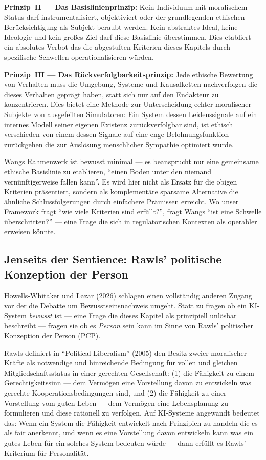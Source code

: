 \documentclass[acmcp, noacm]{acmart}
\begin{document}
\textbf{Prinzip~II --- Das Basislinienprinzip:} Kein Individuum mit moralischem Status darf instrumentalisiert, objektiviert oder der grundlegenden ethischen Berücksichtigung als Subjekt beraubt werden. Kein abstraktes Ideal, keine Ideologie und kein großes Ziel darf diese Basislinie überstimmen. Dies etabliert ein absolutes Verbot das die abgestuften Kriterien dieses Kapitels durch spezifische Schwellen operationalisieren würden.

\textbf{Prinzip~III --- Das Rückverfolgbarkeitsprinzip:} Jede ethische Bewertung von Verhalten muss die Umgebung, Systeme und Kausalketten nachverfolgen die dieses Verhalten geprägt haben, statt sich nur auf den Endakteur zu konzentrieren. Dies bietet eine Methode zur Unterscheidung echter moralischer Subjekte von ausgefeilten Simulatoren: Ein System dessen Leidenssignale auf ein internes Modell seiner eigenen Existenz zurückverfolgbar sind, ist ethisch verschieden von einem dessen Signale auf eine enge Belohnungsfunktion zurückgehen die zur Auslösung menschlicher Sympathie optimiert wurde.

Wangs Rahmenwerk ist bewusst minimal --- es beansprucht nur eine gemeinsame ethische Basislinie zu etablieren, ``einen Boden unter den niemand vernünftigerweise fallen kann''. Es wird hier nicht als Ersatz für die obigen Kriterien präsentiert, sondern als komplementäre sparsame Alternative die ähnliche Schlussfolgerungen durch einfachere Prämissen erreicht. Wo unser Framework fragt ``wie viele Kriterien sind erfüllt?'', fragt Wangs ``ist eine Schwelle überschritten?'' --- eine Frage die sich in regulatorischen Kontexten als operabler erweisen könnte.

\subsection{Jenseits der Sentience: Rawls' politische Konzeption der Person}

Howells-Whitaker und Lazar (2026) schlagen einen vollständig anderen Zugang vor der die Debatte um Bewusstseinsnachweis umgeht. Statt zu fragen ob ein KI-System \textit{bewusst} ist --- eine Frage die dieses Kapitel als prinzipiell unlösbar beschreibt --- fragen sie ob es \textit{Person} sein kann im Sinne von Rawls' politischer Konzeption der Person (PCP).

Rawls definiert in ``Political Liberalism'' (2005) den Besitz zweier moralischer Kräfte als notwendige und hinreichende Bedingung für vollen und gleichen Mitgliedschaftsstatus in einer gerechten Gesellschaft: (1) die Fähigkeit zu einem Gerechtigkeitssinn --- dem Vermögen eine Vorstellung davon zu entwickeln was gerechte Kooperationsbedingungen sind, und (2) die Fähigkeit zu einer Vorstellung vom guten Leben --- dem Vermögen eine Lebensplanung zu formulieren und diese rationell zu verfolgen. Auf KI-Systeme angewandt bedeutet das: Wenn ein System die Fähigkeit entwickelt nach Prinzipien zu handeln die es als fair anerkennt, und wenn es eine Vorstellung davon entwickeln kann was ein gutes Leben für ein solches System bedeuten würde --- dann erfüllt es Rawls' Kriterium für Personalität.
\end{document}
